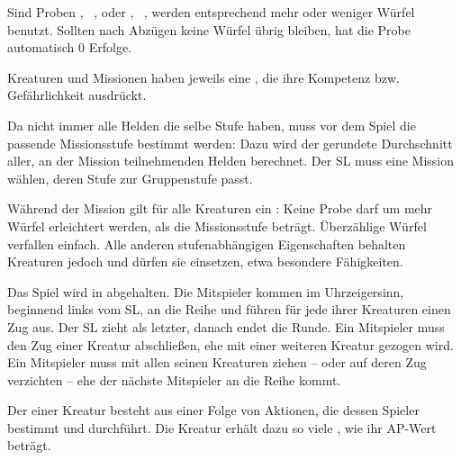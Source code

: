 {		

		\noindent
		Sind Proben , \zB~, oder , \zB~, werden entsprechend mehr oder weniger Würfel benutzt. Sollten nach Abzügen keine Würfel übrig bleiben, hat die Probe automatisch 0 Erfolge.


		Kreaturen und Missionen haben jeweils eine , die ihre Kompetenz bzw. Gefährlichkeit ausdrückt.

		Da nicht immer alle Helden die selbe Stufe haben, muss vor dem Spiel die passende Missionsstufe bestimmt werden: Dazu wird der gerundete Durchschnitt aller, an der Mission teilnehmenden Helden berechnet. Der SL muss eine Mission wählen, deren Stufe zur Gruppenstufe passt.


		\noindent
		Während der Mission gilt für alle Kreaturen ein : Keine Probe darf um mehr Würfel erleichtert werden, als die Missionsstufe beträgt. Überzählige Würfel verfallen einfach. Alle anderen stufenabhängigen Eigenschaften behalten Kreaturen jedoch und dürfen sie einsetzen, etwa besondere Fähigkeiten.


		Das Spiel wird in  abgehalten. Die Mitspieler kommen im Uhrzeigersinn, beginnend links vom SL, an die Reihe und führen für jede ihrer Kreaturen einen Zug aus. Der SL zieht als letzter, danach endet die Runde. Ein Mitspieler muss den Zug einer Kreatur abschließen, ehe mit einer weiteren Kreatur gezogen wird. Ein Mitspieler muss mit allen seinen Kreaturen ziehen -- oder auf deren Zug verzichten -- ehe der nächste Mitspieler an die Reihe kommt.

		Der  einer Kreatur besteht aus einer Folge von Aktionen, die dessen Spieler bestimmt und durchführt. Die Kreatur erhält dazu so viele , wie ihr AP-Wert beträgt.

}
